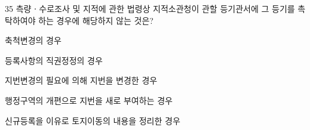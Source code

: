 \begin{question}{35}
측량ㆍ수로조사 및 지적에 관한 법령상 지적소관청이 관할 등기관서에 그 등기를 촉탁하여야 하는 경우에 해당하지 않는 것은?
\begin{choices}
  \item 축척변경의 경우
  \item 등록사항의 직권정정의 경우
  \item 지번변경의 필요에 의해 지번을 변경한 경우
  \item 행정구역의 개편으로 지번을 새로 부여하는 경우
  \item 신규등록을 이유로 토지이동의 내용을 정리한 경우
\end{choices}
\end{question}
